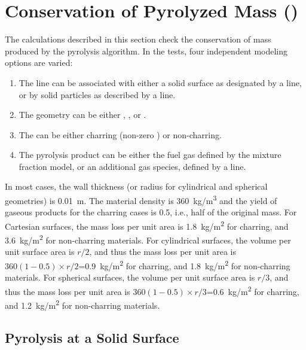 \documentclass[11pt]{book}
\begin{document}
\section{Conservation of Pyrolyzed Mass (\texorpdfstring{}{surf\_mass\_conservation})}

The calculations described in this section check the conservation of mass produced by the pyrolysis algorithm. In the tests, four independent modeling options are varied:
\begin{enumerate}
\item The  line can be associated with either a solid surface as designated by a  line, or by solid particles as described by a  line.
\item The  geometry can be either , , or .
\item The  can be either charring (non-zero ) or non-charring.
\item The pyrolysis product can be either the fuel gas defined by the mixture fraction model, or an additional gas species, defined by a  line.
\end{enumerate}
In most cases, the wall thickness (or radius for cylindrical and spherical geometries) is 0.01~m. The material density is 360~\si{kg/m^3} and the yield of gaseous products for the charring cases is 0.5, i.e., half of the original mass. For Cartesian surfaces, the mass loss per unit area is 1.8~\si{kg/m^2} for charring, and 3.6~\si{kg/m^2} for non-charring materials. For cylindrical surfaces, the volume per unit surface area is $r/2$, and thus the mass loss per unit area is $360(1-0.5) \times r/2$=0.9~\si{kg/m^2} for charring, and 1.8~\si{kg/m^2} for non-charring materials. For spherical surfaces, the volume per unit surface area is $r/3$, and thus the mass loss per unit area is $360(1-0.5) \times r/3$=0.6~\si{kg/m^2} for charring, and 1.2~\si{kg/m^2} for non-charring materials.


\subsection{Pyrolysis at a Solid Surface}
\label{surf_mass_vent_char_cart_fuel}
\label{surf_mass_vent_char_cart_gas}
\label{surf_mass_vent_char_cyl_fuel}
\label{surf_mass_vent_char_cyl_gas}
\label{surf_mass_vent_char_spher_fuel}
\label{surf_mass_vent_char_spher_gas}
\label{surf_mass_vent_nonchar_cart_fuel}
\label{surf_mass_vent_nonchar_cart_gas}
\label{surf_mass_vent_nonchar_cyl_fuel}
\label{surf_mass_vent_nonchar_cyl_gas}
\label{surf_mass_vent_nonchar_spher_fuel}
\label{surf_mass_vent_nonchar_spher_gas}
\end{document}
